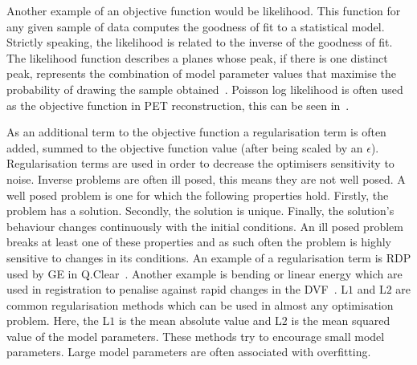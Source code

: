                 Another example of an objective function would be likelihood. This function for any given sample of data computes the goodness of fit to a statistical model. Strictly speaking, the likelihood is related to the inverse of the goodness of fit. 
                The likelihood function describes a planes whose peak, if there is one distinct peak, %
                represents the combination of model parameter values that maximise the probability of drawing the sample obtained~\parencite{Myung2003TutorialEstimation}. %
                Poisson log likelihood is often used as the objective function in \gls{PET} reconstruction, this can be seen in~.
                
                As an additional term to the objective function a regularisation term is often added, summed to the objective function value (after being scaled by an $\epsilon$). Regularisation terms are used in order to decrease the optimisers sensitivity to noise. Inverse problems are often ill posed, this means they are not well posed. A well posed problem is one for which the following properties hold. Firstly, the problem has a solution. Secondly, the solution is unique. Finally, the solution's behaviour changes continuously with the initial conditions. An ill posed problem breaks at least one of these properties and as such often the problem is highly sensitive to changes in its conditions. An example of a regularisation term is \gls{RDP} used by \gls{GE} in Q.Clear~\parencite{qclear}. Another example is bending or linear energy which are used in registration to penalise against rapid changes in the \gls{DVF}~\parencite{Modersitzki2009Fair:FlexibleRegistration}. L$1$ and L$2$ are common regularisation methods which can be used in almost any optimisation problem. Here, the L$1$ is the mean absolute value and L$2$ is the mean squared value of the model parameters. These methods try to encourage small model parameters. Large model parameters are often associated with overfitting.
                
